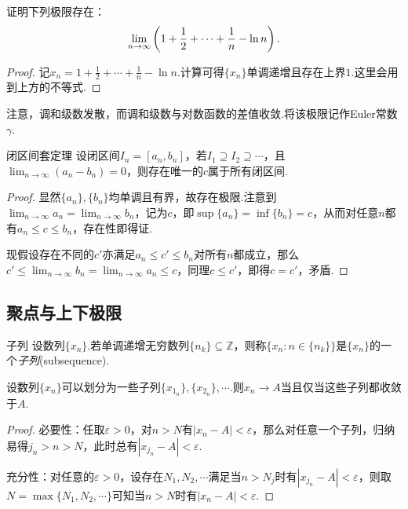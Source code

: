 \begin{example}
	证明下列极限存在：$$\lim_{n\to \infty} \left(  1+\frac{1}{2}+\cdots + \frac{1}{n}-\ln n  \right).$$
\end{example}
\begin{proof}
	记$x_n=1+\frac{1}{2}+\cdots + \frac{1}{n}-\ln n$.计算可得$\{ x_n \}$单调递增且存在上界$1$.这里会用到上方的不等式.
\end{proof}

注意，调和级数发散，而调和级数与对数函数的差值收敛.将该极限记作Euler常数$\gamma$.

\begin{theorem}{闭区间套定理}
	设闭区间$I_n=[a_n,b_n]$，若$I_1 \supseteq I_2 \supseteq \cdots $，且$\lim_{n\to \infty} (a_n-b_n)=0$，则存在唯一的$c$属于所有闭区间.
\end{theorem}
\begin{proof}
	显然$\{ a_n \},\{ b_n \}$均单调且有界，故存在极限.注意到$\lim_{n\to \infty} a_n = \lim_{n\to \infty} b_n$，记为$c$，即$\sup \{ a_n \} = \inf \{ b_n \} = c$，从而对任意$n$都有$a_n \leq c \leq b_n$，存在性即得证.
	
	现假设存在不同的$c'$亦满足$a_n \leq c' \leq b_n$对所有$n$都成立，那么$c' \leq \lim_{n\to \infty} b_n = \lim_{n\to \infty} a_n \leq c$，同理$c \leq c'$，即得$c=c'$，矛盾.
\end{proof}

\subsection{聚点与上下极限}

\begin{definition}{子列}
	设数列$\{ x_n \}$.若单调递增无穷数列$\{ n_k \} \subseteq \mathbb{Z}$，则称$\{ x_n:n \in  \{ n_k \} \}$是$\{ x_n \}$的一个\textit{子列}(subsequence).
\end{definition}

\begin{proposition}{}
	设数列$\{ x_n \}$可以划分为一些子列$\{ x_{1_n} \},\{ x_{2_n} \},\cdots$.则$x_n \to A$当且仅当这些子列都收敛于$A$.
\end{proposition}
\begin{proof}
	必要性：任取$\varepsilon >0$，对$n>N$有$|x_n-A|<\varepsilon$，那么对任意一个子列，归纳易得$j_n>n>N$，此时总有$|x_{j_n}-A|<\varepsilon$.
	
	充分性：对任意的$\varepsilon >0$，设存在$N_1,N_2,\cdots$满足当$n>N_j$时有$|x_{j_n}-A|<\varepsilon$，则取$N=\max \{ N_1,N_2,\cdots \}$可知当$n>N$时有$|x_n-A|<\varepsilon$.
\end{proof}

